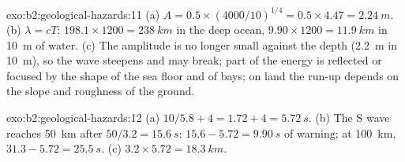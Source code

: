 \begin{solution}{exo:b2:geological-hazards:11}
(a) $A = 0.5 \times (4000/10)^{1/4} = 0.5 \times 4.47 = \qty{2.24}{m}$. (b) $\lambda = cT$:
$198.1 \times 1200 = \qty{238}{km}$ in the deep ocean, $9.90 \times 1200 = \qty{11.9}{km}$ in
\qty{10}{m} of water. (c) The amplitude is no longer small against the depth (\qty{2.2}{m} in
\qty{10}{m}), so the wave steepens and may break; part of the energy is reflected or focused by the
shape of the sea floor and of bays; on land the run-up depends on the slope and roughness of the
ground.
\end{solution}

\begin{solution}{exo:b2:geological-hazards:12}
(a) $10/5.8 + 4 = 1.72 + 4 = \qty{5.72}{s}$. (b) The S wave reaches \qty{50}{km} after $50/3.2 =
\qty{15.6}{s}$: $15.6 - 5.72 = \qty{9.90}{s}$ of warning; at \qty{100}{km}, $31.3 - 5.72 =
\qty{25.5}{s}$. (c) $3.2 \times 5.72 = \qty{18.3}{km}$.
\end{solution}

